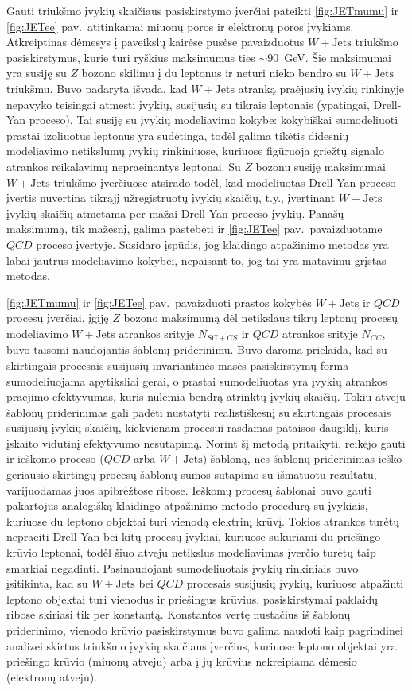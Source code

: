 \documentclass[a4paper, 12pt, oneside]{article}
\newcommand{\WJets}{W\! +\!\mathrm{Jets}}
\newcommand{\QCD}{QC\! D}
\begin{document}
Gauti triukšmo įvykių skaičiaus pasiskirstymo įverčiai pateikti \ref{fig:JETmumu} ir \ref{fig:JETee} pav.\ atitinkamai
miuonų poros ir elektronų poros įvykiams.
Atkreiptinas dėmesys į paveikslų kairėse pusėse pavaizduotus $\WJets$ triukšmo pasiskirstymus, kurie turi ryškius
maksimumus ties $\sim\!90$~GeV.
Šie maksimumai yra susiję su $Z$ bozono skilimu į du leptonus ir neturi nieko bendro su $\WJets$ triukšmu.
Buvo padaryta išvada, kad $\WJets$ atranką praėjusių įvykių rinkinyje nepavyko teisingai atmesti įvykių, susijusių
su tikrais leptonais (ypatingai, Drell-Yan proceso).
Tai susiję su įvykių modeliavimo kokybe: kokybiškai sumodeliuoti prastai izoliuotus leptonus yra sudėtinga, todėl galima
tikėtis didesnių modeliavimo netikslumų įvykių rinkiniuose, kuriuose figūruoja griežtų signalo atrankos reikalavimų nepraeinantys leptonai.
Su $Z$ bozonu susiję maksimumai $\WJets$ triukšmo įverčiuose atsirado todėl, kad modeliuotas Drell-Yan proceso įvertis
nuvertina tikrąjį užregistruotų įvykių skaičių, t.y., įvertinant $\WJets$ įvykių skaičių atmetama per mažai Drell-Yan proceso
įvykių.
Panašų maksimumą, tik mažesnį, galima pastebėti ir \ref{fig:JETee} pav.\ pavaizduotame $\QCD$ proceso įvertyje.
Susidaro įspūdis, jog klaidingo atpažinimo metodas yra labai jautrus modeliavimo kokybei, nepaisant to, jog tai yra matavimu grįstas metodas.

\ref{fig:JETmumu} ir \ref{fig:JETee} pav.\ pavaizduoti prastos kokybės $\WJets$ ir $\QCD$ procesų įverčiai, įgiję $Z$ bozono
maksimumą dėl netikslaus tikrų leptonų procesų modeliavimo $\WJets$ atrankos srityje $N_{SC+CS}$ ir $\QCD$ atrankos srityje
$N_{CC}$, buvo taisomi naudojantis šablonų priderinimu.
Buvo daroma prielaida, kad su skirtingais procesais susijusių invariantinės masės pasiskirstymų forma sumodeliuojama
apytiksliai gerai, o prastai sumodeliuotas yra įvykių atrankos praėjimo efektyvumas, kuris nulemia bendrą atrinktų įvykių skaičių.
Tokiu atveju šablonų priderinimas gali padėti nustatyti realistiškesnį su skirtingais procesais susijusių įvykių skaičių,
kiekvienam procesui rasdamas pataisos daugiklį, kuris įskaito vidutinį efektyvumo nesutapimą.
Norint šį metodą pritaikyti, reikėjo gauti ir ieškomo proceso ($\QCD$ arba $\WJets$) šabloną, nes šablonų priderinimas
ieško geriausio skirtingų procesų šablonų sumos sutapimo su išmatuotu rezultatu, varijuodamas juos apibrėžtose ribose.
Ieškomų procesų šablonai buvo gauti pakartojus analogišką klaidingo atpažinimo metodo procedūrą su įvykiais, kuriuose du
leptono objektai turi vienodą elektrinį krūvį.
Tokios atrankos turėtų nepraeiti Drell-Yan bei kitų procesų įvykiai, kuriuose sukuriami du priešingo krūvio leptonai, todėl šiuo
atveju netikslus modeliavimas įverčio turėtų taip smarkiai negadinti.
Pasinaudojant sumodeliuotais įvykių rinkiniais buvo įsitikinta, kad su $\WJets$ bei $\QCD$ procesais susijusių įvykių, kuriuose
atpažinti leptono objektai turi vienodus ir priešingus krūvius, pasiskirstymai paklaidų ribose skiriasi tik per konstantą.
Konstantos vertę nustačius iš šablonų priderinimo, vienodo krūvio pasiskirstymus buvo galima naudoti kaip pagrindinei analizei skirtus
triukšmo įvykių skaičiaus įverčius, kuriuose leptono objektai yra priešingo krūvio (miuonų atveju) arba į jų krūvius nekreipiama
dėmesio (elektronų atveju).
\end{document}
